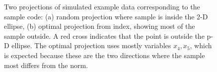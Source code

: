 \documentclass[
  12pt,
]{interact}
\begin{document}
\begin{figure}

\begin{minipage}{0.50\linewidth}



\end{minipage}%
%
\begin{minipage}{0.50\linewidth}



\end{minipage}%

\caption{\label{fig-anomaly}Two projections of simulated example data
corresponding to the sample code: (a) random projection where sample is
inside the 2-D ellipse, (b) optimal projection from index, showing most
of the sample outside. A red cross indicates that the point is outside
the p-D ellipse. The optimal projection uses mostly variables
\(x_4, x_5\), which is expected because these are the two directions
where the sample most differs from the norm.}

\end{figure}%
\end{document}
